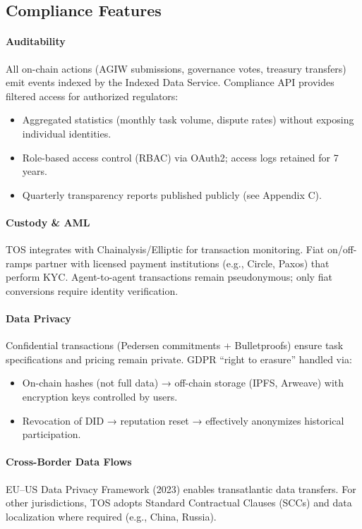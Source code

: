 \documentclass[11pt]{article}
\begin{document}
\subsection{Compliance Features}

\paragraph{Auditability}
All on-chain actions (AGIW submissions, governance votes, treasury transfers) emit events indexed by the Indexed Data Service. Compliance API provides filtered access for authorized regulators:
\begin{itemize}[noitemsep]
  \item Aggregated statistics (monthly task volume, dispute rates) without exposing individual identities.
  \item Role-based access control (RBAC) via OAuth2; access logs retained for 7 years.
  \item Quarterly transparency reports published publicly (see Appendix C).
\end{itemize}

\paragraph{Custody \& AML}
TOS integrates with Chainalysis/Elliptic for transaction monitoring. Fiat on/off-ramps partner with licensed payment institutions (e.g., Circle, Paxos) that perform KYC. Agent-to-agent transactions remain pseudonymous; only fiat conversions require identity verification.

\paragraph{Data Privacy}
Confidential transactions (Pedersen commitments + Bulletproofs) ensure task specifications and pricing remain private. GDPR ``right to erasure'' handled via:
\begin{itemize}[noitemsep]
  \item On-chain hashes (not full data) → off-chain storage (IPFS, Arweave) with encryption keys controlled by users.
  \item Revocation of DID → reputation reset → effectively anonymizes historical participation.
\end{itemize}

\paragraph{Cross-Border Data Flows}
EU--US Data Privacy Framework (2023) enables transatlantic data transfers. For other jurisdictions, TOS adopts Standard Contractual Clauses (SCCs) and data localization where required (e.g., China, Russia).
\end{document}
